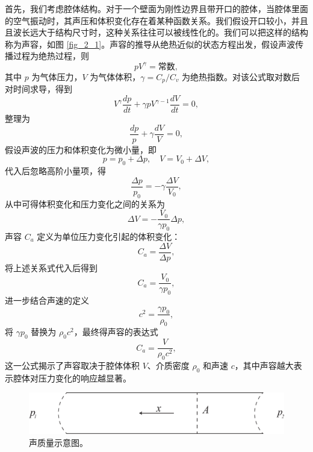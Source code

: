 首先，我们考虑腔体结构。对于一个壁面为刚性边界且带开口的腔体，当腔体里面的空气振动时，其声压和体积变化存在着某种函数关系。我们假设开口较小，并且且波长远大于结构尺寸时，这种关系往往可以被线性化的。我们可以把这样的结构称为声容，如图 \ref{fig_2_1}。声容的推导从绝热近似的状态方程出发，假设声波传播过程为绝热过程，则
\begin{equation} \label{eq2-1}
  pV^\gamma = \text{常数},
\end{equation}
其中 \(p\) 为气体压力，\(V\) 为气体体积，\(\gamma = C_p/{C_v}\) 为绝热指数。对该公式取对数后对时间求导，得到
\begin{equation} \label{eq2-2}
  V^\gamma \frac{dp}{dt} + \gamma p V^{\gamma-1} \frac{dV}{dt} = 0,
\end{equation}
整理为
\begin{equation} \label{eq2-3}
  \frac{dp}{p} + \gamma \frac{dV}{V} = 0,
\end{equation}
假设声波的压力和体积变化为微小量，即
\begin{equation} \label{eq2-4}
  p = p_0 + \Delta p, \quad V = V_0 + \Delta V,
\end{equation}
代入后忽略高阶小量项，得
\begin{equation} \label{eq2-5}
  \frac{\Delta p}{p_0} = -\gamma \frac{\Delta V}{V_0},
\end{equation}
从中可得体积变化和压力变化之间的关系为
\begin{equation} \label{eq2-6}
  \Delta V = -\frac{V_0}{\gamma p_0} \Delta p,
\end{equation}
声容 \(C_a\) 定义为单位压力变化引起的体积变化：
\begin{equation} \label{eq2-7}
  C_a = \frac{\Delta V}{\Delta p},
\end{equation}
将上述关系式代入后得到
\begin{equation} \label{eq2-8}
  C_a = \frac{V_0}{\gamma p_0},
\end{equation}
进一步结合声速的定义
\begin{equation} \label{eq2-9}
  c^2 = \frac{\gamma p_0}{\rho_0},
\end{equation}
将 \(\gamma p_0\) 替换为 \(\rho_0 c^2\)，最终得声容的表达式
\begin{equation} \label{eq2-10}
  C_a = \frac{V}{\rho_0 c^2},
\end{equation}
这一公式揭示了声容取决于腔体体积 \(V\)、介质密度 \(\rho_0\) 和声速 \(c\)，其中声容越大表示腔体对压力变化的响应越显著。

\begin{figure}[h!]
  \centering
  \includegraphics[width=1\textwidth]{images/fig2-2.eps} 
  \caption{声质量示意图。 }
  \label{fig_2_2}
\end{figure}

